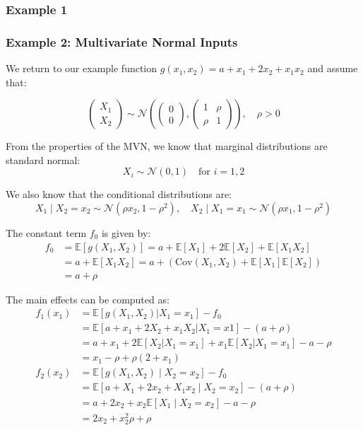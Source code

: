 \subsubsection*{Example 1}

\subsubsection*{Example 2: Multivariate Normal Inputs}

We return to our example function \(g(x_1, x_2) = a + x_1 + 2x_2 + x_1 x_2\) and assume that:

\[
\begin{pmatrix}
X_1 \\
X_2
\end{pmatrix}
\sim \mathcal{N}\left(
\begin{pmatrix} 0 \\ 0 \end{pmatrix},
\begin{pmatrix}
1 & \rho \\
\rho & 1
\end{pmatrix}
\right), \quad \rho > 0
\]

From the properties of the MVN, we know that marginal distributions are standard normal:
\[
X_i \sim \mathcal{N}(0, 1) \quad \text{for } i = 1, 2
\]

We also know that the conditional distributions are:
\[
X_1 \mid X_2 = x_2 \sim \mathcal{N}(\rho x_2, 1 - \rho^2), \quad
X_2 \mid X_1 = x_1 \sim \mathcal{N}(\rho x_1, 1 - \rho^2)
\]

The constant term \( f_0 \) is given by:
\begin{align*}
f_0 &= \mathbb{E}[g(X_1, X_2)] 
= a + \mathbb{E}[X_1] + 2\mathbb{E}[X_2] + \mathbb{E}[X_1 X_2] \\
&= a + \mathbb{E}[X_1 X_2] 
= a + \left( \text{Cov}(X_1, X_2) + \mathbb{E}[X_1]\mathbb{E}[X_2] \right) \\
&= a + \rho
\end{align*}

The main effects can be computed as:
\begin{align*}
f_1(x_1) 
&= \mathbb{E}[g(X_1, X_2) | X_1 = x_1] - f_0 \\
&= \mathbb{E}[a + x_1 + 2X_2 + x_1 X_2 | X_1 = x1] - (a + \rho) \\
&= a + x_1 + 2\mathbb{E}[X_2 | X_1 = x_1] + x_1 \mathbb{E}[X_2 | X_1 = x_1] - a - \rho \\
&= x_1 - \rho + \rho(2 + x_1) \\
f_2(x_2) 
&= \mathbb{E}[g(X_1, X_2) \mid X_2 = x_2] - f_0 \\
&= \mathbb{E}[a + X_1 + 2x_2 + X_1 x_2 \mid X_2 = x_2] - (a + \rho) \\
&= a + 2x_2 + x_2 \mathbb{E}[X_1 \mid X_2 = x_2] - a - \rho \\
&= 2x_2 + x_2^2\rho + \rho
\end{align*}

